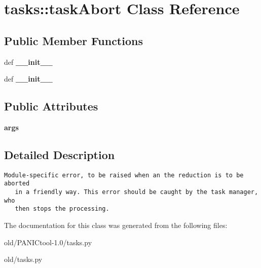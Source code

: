 \section{tasks::task\-Abort Class Reference}
\label{classtasks_1_1taskAbort}
\subsection*{Public Member Functions}
\begin{CompactItemize}
\item 
def \textbf{\_\-\_\-init\_\-\_\-}\label{classtasks_1_1taskAbort_78ce6c70e9b2efac71ddf577426d37f5}

\item 
def \textbf{\_\-\_\-init\_\-\_\-}\label{classtasks_1_1taskAbort_78ce6c70e9b2efac71ddf577426d37f5}

\end{CompactItemize}
\subsection*{Public Attributes}
\begin{CompactItemize}
\item 
\textbf{args}\label{classtasks_1_1taskAbort_63920492ef729a7582a9d14293624dba}

\end{CompactItemize}


\subsection{Detailed Description}


\footnotesize\begin{verbatim}Module-specific error, to be raised when an the reduction is to be aborted
   in a friendly way. This error should be caught by the task manager, who
   then stops the processing.
\end{verbatim}
\normalsize
 



The documentation for this class was generated from the following files:\begin{CompactItemize}
\item 
old/PANICtool-1.0/tasks.py\item 
old/tasks.py\end{CompactItemize}
